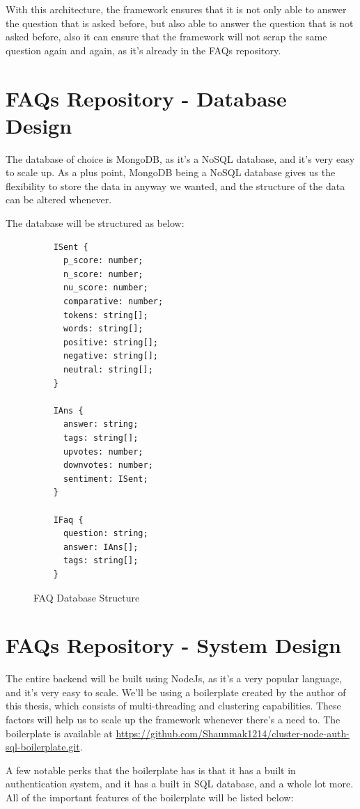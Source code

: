 With this architecture, the framework ensures that it is not only able to answer the question that is asked before, but also able to answer the question that is not asked before, also it can ensure that the framework will not scrap the same question again and again, as it's already in the FAQs repository.

\section{FAQs Repository - Database Design}
The database of choice is MongoDB, as it's a NoSQL database, and it's very easy to scale up. As a plus point, MongoDB being a NoSQL database gives us the flexibility to store the data in anyway we wanted, and the structure of the data can be altered whenever. 

The database will be structured as below:

\begin{figure}[H]
  \begin{lstlisting}
    ISent {
      p_score: number;
      n_score: number;
      nu_score: number;
      comparative: number;
      tokens: string[];
      words: string[];
      positive: string[];
      negative: string[]; 
      neutral: string[];
    }
    
    IAns {
      answer: string;
      tags: string[];
      upvotes: number;
      downvotes: number;
      sentiment: ISent;
    }
    
    IFaq {
      question: string;
      answer: IAns[];
      tags: string[];
    }
    \end{lstlisting}
  \caption{FAQ Database Structure}
  \label{faq_db_structure}
\end{figure}


\section{FAQs Repository - System Design}
The entire backend will be built using NodeJs, as it's a very popular language, and it's very easy to scale. We'll be using a boilerplate created by the author of this thesis, which consists of multi-threading and clustering capabilities. These factors will help us to scale up the framework whenever there's a need to. The boilerplate is available at \url{https://github.com/Shaunmak1214/cluster-node-auth-sql-boilerplate.git}. 

A few notable perks that the boilerplate has is that it has a built in authentication system, and it has a built in SQL database, and a whole lot more. All of the important features of the boilerplate will be listed below:

